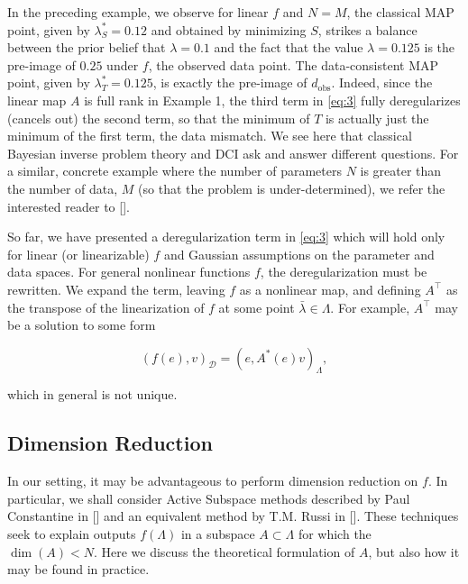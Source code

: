 \documentclass{amsart}
\begin{document}
\vspace{.125cm}

In the preceding example, we observe for linear $f$ and $N=M$, the classical MAP point, given by $\lambda_S^*=0.12$ and obtained by minimizing $S$, strikes a balance between the prior belief that $\lambda=0.1$ and the fact that the value $\lambda=0.125$ is the pre-image of $0.25$ under $f$, the observed data point. The data-consistent MAP point, given by $\lambda_T^*=0.125$, is exactly the pre-image of $d_\text{obs}$. Indeed, since the linear map $A$ is full rank in Example 1, the third term in \eqref{eq:3} fully deregularizes (cancels out) the second term, so that the minimum of $T$ is actually just the minimum of the first term, the data mismatch. We see here that classical Bayesian inverse problem theory and DCI ask and answer different questions. For a similar, concrete example where the number of parameters $N$ is greater than the number of data, $M$ (so that the problem is under-determined), we refer the interested reader to []. 


So far, we have presented a deregularization term in \eqref{eq:3} which will hold only for linear (or linearizable) $f$ and Gaussian assumptions on the parameter and data spaces. For general nonlinear functions $f$, the deregularization must be rewritten. We expand the term, leaving $f$ as a nonlinear map, and defining $A^\top$ as the transpose of the linearization of $f$ at some point $\bar{\lambda}\in \Lambda$. For example, $A^\top$ may be a solution to some form 

\begin{equation} \label{eq:5}
(f(e),v)_\mathcal{D}=(e,A^*(e)v)_\Lambda,
\end{equation} 
 

\noindent which in general is not unique. 












\subsection{Dimension Reduction}

In our setting, it may be advantageous to perform dimension reduction on $f$. In particular, we shall consider Active Subspace methods described by Paul Constantine in [] and an equivalent method by T.M. Russi in []. These techniques seek to explain outputs $f(\Lambda)$ in a subspace $A \subset \Lambda$ for which the $\dim (A) <N$. Here we discuss the theoretical formulation of $A$, but also how it may be found in practice.
\end{document}
